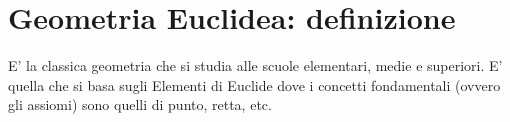 \section{Geometria Euclidea: definizione}
\begin{definizione}
E' la classica geometria che si studia alle scuole elementari, medie e superiori. E' quella che si basa sugli Elementi di Euclide dove
i concetti fondamentali (ovvero gli assiomi) sono quelli di punto, retta, etc.
\end{definizione}




